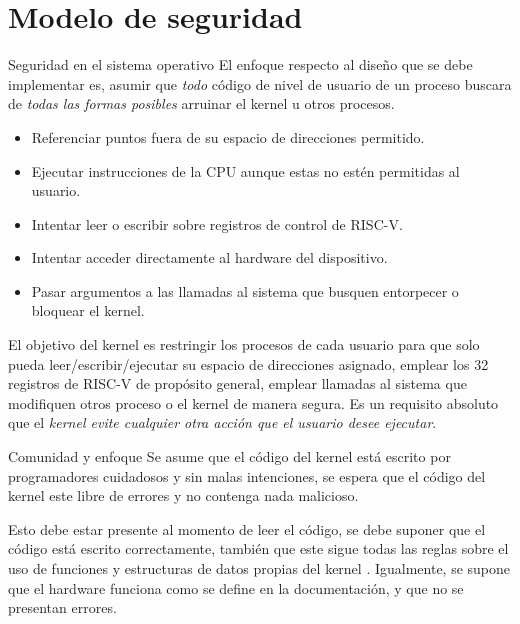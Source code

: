 \documentclass{libs/ufc_format}
\begin{document}
\section{Modelo de seguridad}
\begin{frame}{Seguridad en el sistema operativo}
  El enfoque respecto al diseño que se debe implementar es, asumir que \emph{todo} código de nivel de usuario de un proceso buscara de \emph{todas las formas posibles} arruinar el kernel u otros procesos.

  \vspace{0.3cm}

  \begin{itemize}
    \item Referenciar puntos fuera de su espacio de direcciones permitido.
    \item Ejecutar instrucciones de la CPU aunque estas no estén permitidas al usuario.
    \item Intentar leer o escribir sobre registros de control de RISC-V.
    \item Intentar acceder directamente al hardware del dispositivo.
    \item Pasar argumentos a las llamadas al sistema que busquen entorpecer o bloquear el kernel.
  \end{itemize}
\end{frame}
\begin{frame}{}
  El objetivo del kernel es restringir los procesos de cada usuario para que solo pueda leer/escribir/ejecutar su espacio de direcciones asignado, emplear los 32 registros de RISC-V de propósito general, emplear llamadas al sistema que modifiquen otros proceso o el kernel de manera segura. Es un requisito absoluto que el \emph{kernel evite cualquier otra acción que el usuario desee ejecutar}. \cite{xv6_book}
\end{frame}
\begin{frame}{Comunidad y enfoque}
  Se asume que el código del kernel está escrito por programadores cuidadosos y sin malas intenciones, se espera que el código del kernel este libre de errores y no contenga nada malicioso. \cite{xv6_book} \newline

  \vspace{0.3cm}

  Esto debe estar presente al momento de leer el código, se debe suponer que el código está escrito correctamente, también que este sigue todas las reglas sobre el uso de funciones y estructuras de datos propias del kernel \cite{xv6_book}. Igualmente, se supone que el hardware funciona como se define en la documentación, y que no se presentan errores.
\end{frame}
\end{document}
